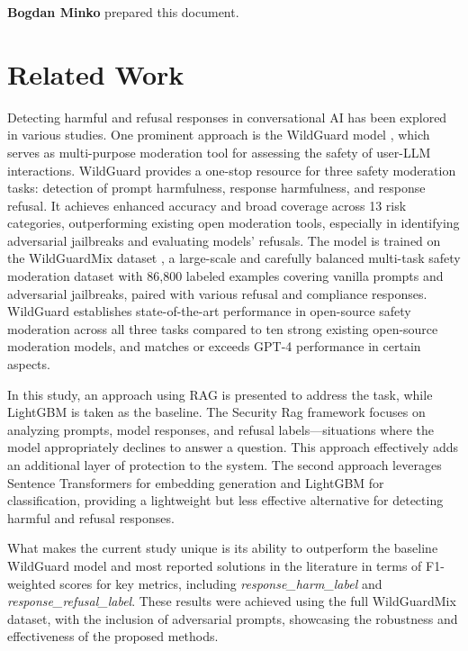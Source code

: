 \documentclass{article}
\begin{document}
\textbf{Bogdan Minko} prepared this document.



\section{Related Work}
\label{sec:related}

Detecting harmful and refusal responses in conversational AI has been explored in various studies. One prominent approach is the WildGuard model \cite{wildguard2024paper}, which serves as multi-purpose moderation tool for assessing the safety of user-LLM interactions. WildGuard provides a one-stop resource for three safety moderation tasks: detection of prompt harmfulness, response harmfulness, and response refusal. It achieves enhanced accuracy and broad coverage across 13 risk categories, outperforming existing open moderation tools, especially in identifying adversarial jailbreaks and evaluating models’ refusals. The model is trained on the WildGuardMix dataset \cite{wildguardmix2024}, a large-scale and carefully balanced multi-task safety moderation dataset with 86,800 labeled examples covering vanilla prompts and adversarial jailbreaks, paired with various refusal and compliance responses. WildGuard establishes state-of-the-art performance in open-source safety moderation across all three tasks compared to ten strong existing open-source moderation models, and matches or exceeds GPT-4 performance in certain aspects.

In this study, an approach using RAG is presented to address the task, while LightGBM is taken as the baseline. The Security Rag framework focuses on analyzing prompts, model responses, and refusal labels—situations where the model appropriately declines to answer a question. This approach effectively adds an additional layer of protection to the system. The second approach leverages Sentence Transformers for embedding generation and LightGBM for classification, providing a lightweight but less effective alternative for detecting harmful and refusal responses.

What makes the current study unique is its ability to outperform the baseline WildGuard model and most reported solutions in the literature in terms of F1-weighted scores for key metrics, including \textit{response\_harm\_label} and \textit{response\_refusal\_label}. These results were achieved using the full WildGuardMix dataset, with the inclusion of adversarial prompts, showcasing the robustness and effectiveness of the proposed methods.
\end{document}
